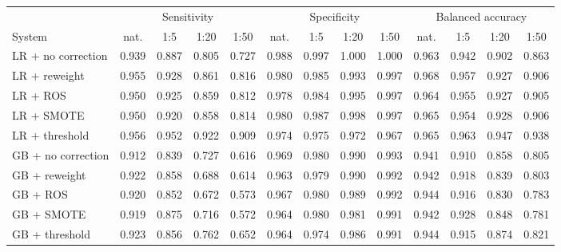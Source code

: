\begin{tabular}{lcccccccccccc}
\toprule
 & \multicolumn{4}{c}{Sensitivity} & \multicolumn{4}{c}{Specificity} & \multicolumn{4}{c}{Balanced accuracy} \\
System & nat. & 1:5 & 1:20 & 1:50 & nat. & 1:5 & 1:20 & 1:50 & nat. & 1:5 & 1:20 & 1:50 \\
\midrule
LR + no correction & 0.939 & 0.887 & 0.805 & 0.727 & 0.988 & 0.997 & 1.000 & 1.000 & 0.963 & 0.942 & 0.902 & 0.863 \\
LR + reweight & 0.955\rlap{$^{*}$} & 0.928\rlap{$^{*}$} & 0.861\rlap{$^{*}$} & 0.816\rlap{$^{*}$} & 0.980\rlap{$^{*}$} & 0.985\rlap{$^{*}$} & 0.993\rlap{$^{*}$} & 0.997 & 0.968\rlap{$^{*}$} & 0.957\rlap{$^{*}$} & 0.927\rlap{$^{*}$} & 0.906\rlap{$^{*}$} \\
LR + ROS & 0.950\rlap{$^{*}$} & 0.925\rlap{$^{*}$} & 0.859\rlap{$^{*}$} & 0.812\rlap{$^{*}$} & 0.978\rlap{$^{*}$} & 0.984\rlap{$^{*}$} & 0.995 & 0.997 & 0.964 & 0.955\rlap{$^{*}$} & 0.927\rlap{$^{*}$} & 0.905\rlap{$^{*}$} \\
LR + SMOTE & 0.950\rlap{$^{*}$} & 0.920\rlap{$^{*}$} & 0.858\rlap{$^{*}$} & 0.814\rlap{$^{*}$} & 0.980\rlap{$^{*}$} & 0.987\rlap{$^{*}$} & 0.998 & 0.997 & 0.965 & 0.954\rlap{$^{*}$} & 0.928\rlap{$^{*}$} & 0.906\rlap{$^{*}$} \\
LR + threshold & 0.956\rlap{$^{*}$} & 0.952\rlap{$^{*}$} & 0.922\rlap{$^{*}$} & 0.909\rlap{$^{*}$} & 0.974\rlap{$^{*}$} & 0.975\rlap{$^{*}$} & 0.972\rlap{$^{*}$} & 0.967\rlap{$^{*}$} & 0.965 & 0.963\rlap{$^{*}$} & 0.947\rlap{$^{*}$} & 0.938\rlap{$^{*}$} \\
\midrule
GB + no correction & 0.912 & 0.839 & 0.727 & 0.616 & 0.969 & 0.980 & 0.990 & 0.993 & 0.941 & 0.910 & 0.858 & 0.805 \\
GB + reweight & 0.922 & 0.858 & 0.688 & 0.614 & 0.963 & 0.979 & 0.990 & 0.992 & 0.942 & 0.918 & 0.839 & 0.803 \\
GB + ROS & 0.920 & 0.852 & 0.672 & 0.573 & 0.967 & 0.980 & 0.989 & 0.992 & 0.944 & 0.916 & 0.830 & 0.783 \\
GB + SMOTE & 0.919 & 0.875\rlap{$^{*}$} & 0.716 & 0.572 & 0.964 & 0.980 & 0.981 & 0.991 & 0.942 & 0.928\rlap{$^{*}$} & 0.848 & 0.781 \\
GB + threshold & 0.923\rlap{$^{*}$} & 0.856\rlap{$^{*}$} & 0.762 & 0.652 & 0.964 & 0.974\rlap{$^{*}$} & 0.986 & 0.991 & 0.944\rlap{$^{*}$} & 0.915\rlap{$^{*}$} & 0.874 & 0.821 \\
\bottomrule
\end{tabular}